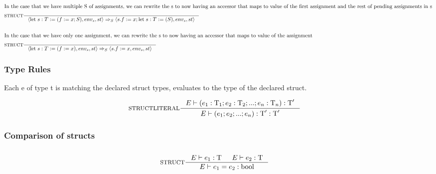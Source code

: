 \begin{align*}
\intertext{In the case that we have multiple S of assignments, we can rewrite the s to now having an accessor that maps to value of the first assignment and the rest of pending assignments in s}
&\inference[$\text{STRUCT}$]{}
                            {\Braket{\Tlet \; s:T := (f := x;S),env_s,st} \Rightarrow_S \Braket{s.f := x;\Tlet \; s:T := (S),env_s,st}}
\\\\
\intertext{In the case that we have only one assignment, we can rewrite the s to now having an accessor that maps to value of the assignment}
&\inference[$\text{STRUCT}$]{}
                            {\Braket{\Tlet \; s:T := (f := x),env_s,st} \Rightarrow_S \Braket{s.f := x,env_s,st}}
\end{align*}

\subsubsection{Type Rules}

Each e of type t is matching the declared struct types, evaluates to the type of the declared struct.

\begin{align*}
&\inference[STRUCTLITERAL]{\Tenv (e_1 : \Tt_1;e_2 : \Tt_2;...;e_n : \Tt_n):\Tt'}
                 {\Tenv \mathbin{\text{(}} e_1; e_2;...;e_n\mathbin{\text{)}}:\Tt': \Tt'}
\end{align*}

\subsubsection{Comparison of structs}
\begin{align*}
\intertext{}
&\inference[STRUCT]{\Tenv e_1: \Tt & \Tenv e_2: \Tt}
                 {\Tenv e_1 = e_2: \Tbool}
\end{align*}
